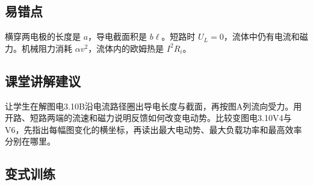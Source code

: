\documentclass[UTF8,fontset=fandol,a4paper,11pt]{ctexart}
\begin{document}

\subsection*{易错点}

横穿两电极的长度是 $a$，导电截面积是 $b\ell$。短路时 $U_L=0$，流体中仍有电流和磁力。机械阻力消耗 $\alpha v^2$，流体内的欧姆热是 $I^2R_i$。



\subsection*{课堂讲解建议}

让学生在解图电3.10B沿电流路径圈出导电长度与截面，再按图A列流向受力。用开路、短路两端的流速和磁力说明反馈如何改变电动势。比较变图电3.10V4与V6，先指出每幅图变化的横坐标，再读出最大电动势、最大负载功率和最高效率分别在哪里。


\subsection*{变式训练}
\end{document}
